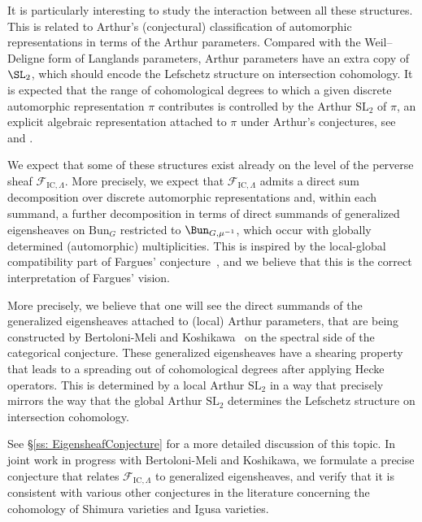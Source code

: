 \documentclass[letterpaper,11pt]{amsart}
\begin{document}
It is particularly interesting to study the interaction between all these structures. This is related to Arthur's (conjectural) classification of automorphic representations in terms of the Arthur parameters. Compared with the Weil--Deligne form of Langlands parameters, Arthur parameters have an extra copy of $\SL_2$, which should encode the Lefschetz structure on intersection cohomology. It is expected that the range of cohomological degrees to which a given discrete automorphic representation $\pi$ contributes is controlled by the Arthur $\mathrm{SL}_2$ of $\pi$, an explicit algebraic representation attached to $\pi$ under Arthur's conjectures, see \cite{ArthurUnipotentConjectures} and \cite{KoshikawaShin}. 

We expect that some of these structures exist already on the level of the perverse sheaf $\mathcal{F}_{\mathrm{IC},\Lambda}$. More precisely, we expect that $\mathcal{F}_{\mathrm{IC},\Lambda}$ admits a direct sum decomposition over discrete automorphic representations and, within each summand, a further decomposition in terms of direct summands of generalized eigensheaves on $\mathrm{Bun}_G$ restricted to $\Bun_{G,\mu^{-1}}$, which occur with globally determined (automorphic) multiplicities. This is inspired by the local-global compatibility part of Fargues' conjecture~\cite[Section 7]{Fargues-Overview}, and we believe that this is the correct interpretation of Fargues' vision.

More precisely, we believe that one will see the direct summands of the generalized eigensheaves attached to (local) Arthur parameters, that are being constructed by Bertoloni-Meli and Koshikawa~\cite{CuspidalSheavesBertiKoshikawa} on the spectral side of the categorical conjecture. These generalized eigensheaves have a shearing property that leads to a spreading out of cohomological degrees after applying Hecke operators. This is determined by a local Arthur $\mathrm{SL}_2$ in a way that precisely mirrors the way that the global Arthur $\mathrm{SL}_2$ determines the Lefschetz structure on intersection cohomology. 

See \S \ref{ss: EigensheafConjecture} for a more detailed discussion of this topic. In joint work in progress with Bertoloni-Meli and Koshikawa, we formulate a precise conjecture that relates $\mathcal{F}_{\mathrm{IC},\Lambda}$ to generalized eigensheaves, and verify that it is consistent with various other conjectures in the literature concerning the cohomology of Shimura varieties and Igusa varieties.
\end{document}
